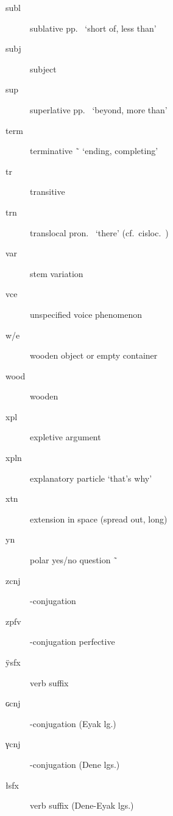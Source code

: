 \begin{multicols}{2}
\begin{description}
\item[subl]	sublative pp.\  ‘short of, less than’
\item[subj]	subject
\item[sup]		superlative pp.\  ‘beyond, more than’
\item[term]	terminative  \~\  ‘ending, completing’
\item[tr]		transitive
\item[trn]		translocal pron.\  ‘there’ (cf.\ cisloc.\ )
\item[var]		stem variation
\item[vce]		unspecified voice phenomenon
\item[w/e]		wooden object or empty container
\item[wood]	wooden
\item[xpl]		expletive argument
\item[xpln]	explanatory particle  ‘that’s why’
\item[xtn]		extension in space (spread out, long)
\item[yn]		polar yes/no question  \~\ 
\item[zcnj]	-conjugation
\item[zpfv]	-conjugation perfective
\item[ÿsfx]	 verb suffix
\item[ɢcnj]	-conjugation (Eyak lg.)
\item[γcnj]	-conjugation (Dene lgs.)
\item[łsfx]		 verb suffix (Dene-Eyak lgs.)
\end{description}
\end{multicols}

